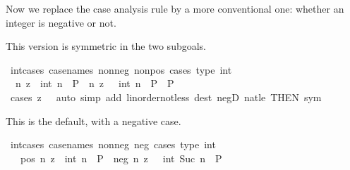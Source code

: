 \begin{isabellebody}
%
\begin{isamarkuptext}%
Now we replace the case analysis rule by a more conventional one:
  whether an integer is negative or not.%
\end{isamarkuptext}\isamarkuptrue%
%
\begin{isamarkuptext}%
This version is symmetric in the two subgoals.%
\end{isamarkuptext}\isamarkuptrue%
\isamarkupfalse%
\ int{\isacharunderscore}{\kern0pt}cases{}\ {\isacharbrackleft}{\kern0pt}case{\isacharunderscore}{\kern0pt}names\ nonneg\ nonpos{\isacharcomma}{\kern0pt}\ cases\ type{\isacharcolon}{\kern0pt}\ int{\isacharbrackright}{\kern0pt}{\isacharcolon}{\kern0pt}\isanewline
\ \ {\isachardoublequoteopen}{\isacharparenleft}{\kern0pt}{\isasymAnd}n{\isachardot}{\kern0pt}\ z\ {\isacharequal}{\kern0pt}\ int\ n\ {\isasymLongrightarrow}\ P{\isacharparenright}{\kern0pt}\ {\isasymLongrightarrow}\ {\isacharparenleft}{\kern0pt}{\isasymAnd}n{\isachardot}{\kern0pt}\ z\ {\isacharequal}{\kern0pt}\ {\isacharminus}{\kern0pt}\ {\isacharparenleft}{\kern0pt}int\ n{\isacharparenright}{\kern0pt}\ {\isasymLongrightarrow}\ P{\isacharparenright}{\kern0pt}\ {\isasymLongrightarrow}\ P{\isachardoublequoteclose}\isanewline
%
\isadelimproof
\ \ %
\endisadelimproof
%
\isatagproof
{}\isamarkupfalse%
\ {\isacharparenleft}{\kern0pt}cases\ {\isachardoublequoteopen}z\ {\isacharless}{\kern0pt}\ {}{\isachardoublequoteclose}{\isacharparenright}{\kern0pt}\ {\isacharparenleft}{\kern0pt}auto\ simp\ add{\isacharcolon}{\kern0pt}\ linorder{\isacharunderscore}{\kern0pt}not{\isacharunderscore}{\kern0pt}less\ dest{\isacharbang}{\kern0pt}{\isacharcolon}{\kern0pt}\ negD\ nat{\isacharunderscore}{\kern0pt}{}{\isacharunderscore}{\kern0pt}le\ {\isacharbrackleft}{\kern0pt}THEN\ sym{\isacharbrackright}{\kern0pt}{\isacharparenright}{\kern0pt}%
\endisatagproof
{\isafoldproof}%
%
\isadelimproof
%
\endisadelimproof
%
\begin{isamarkuptext}%
This is the default, with a negative case.%
\end{isamarkuptext}\isamarkuptrue%
\isamarkupfalse%
\ int{\isacharunderscore}{\kern0pt}cases\ {\isacharbrackleft}{\kern0pt}case{\isacharunderscore}{\kern0pt}names\ nonneg\ neg{\isacharcomma}{\kern0pt}\ cases\ type{\isacharcolon}{\kern0pt}\ int{\isacharbrackright}{\kern0pt}{\isacharcolon}{\kern0pt}\isanewline
\ \ \ pos{\isacharcolon}{\kern0pt}\ {\isachardoublequoteopen}{\isasymAnd}n{\isachardot}{\kern0pt}\ z\ {\isacharequal}{\kern0pt}\ int\ n\ {\isasymLongrightarrow}\ P{\isachardoublequoteclose}\ \ neg{\isacharcolon}{\kern0pt}\ {\isachardoublequoteopen}{\isasymAnd}n{\isachardot}{\kern0pt}\ z\ {\isacharequal}{\kern0pt}\ {\isacharminus}{\kern0pt}\ {\isacharparenleft}{\kern0pt}int\ {\isacharparenleft}{\kern0pt}Suc\ n{\isacharparenright}{\kern0pt}{\isacharparenright}{\kern0pt}\ {\isasymLongrightarrow}\ P{\isachardoublequoteclose}\isanewline

\end{isabellebody}
